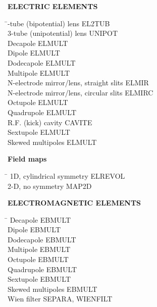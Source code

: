 \noindent\textbf{ELECTRIC ELEMENTS}  
\smallskip

\begin{tabbing}
\hspace*{7cm} \= -tube (bipotential) lens \> EL2TUB \\
  3-tube (unipotential) lens \> UNIPOT \\
  Decapole                \> ELMULT \\
  Dipole                  \> ELMULT \\
  Dodecapole              \> ELMULT \\
  Multipole               \> ELMULT \\
  N-electrode mirror/lens, straight slits            \> ELMIR \\
  N-electrode mirror/lens, circular slits            \> ELMIRC \\
  Octupole                \> ELMULT \\
  Quadrupole              \> ELMULT \\
  R.F. (kick) cavity             \> CAVITE \\
  Sextupole               \> ELMULT \\
  Skewed multipoles       \> ELMULT 
\end{tabbing}
\bigskip

\noindent\textbf{Field maps} 
\smallskip

\begin{tabbing}
\hspace*{7cm} \= \kill
 1D, cylindrical symmetry  \> ELREVOL  \\
  2-D, no symmetry          \> MAP2D 
\end{tabbing}

\newpage

\noindent\textbf{ELECTROMAGNETIC ELEMENTS}  
\smallskip

\begin{tabbing}
\hspace*{7cm} \= \kill
  Decapole                \> EBMULT \\
  Dipole                  \> EBMULT \\
  Dodecapole              \> EBMULT \\
  Multipole               \> EBMULT \\
  Octupole                \> EBMULT \\
  Quadrupole              \> EBMULT \\
  Sextupole               \> EBMULT \\
  Skewed multipoles       \> EBMULT \\
  Wien filter             \> SEPARA, WIENFILT 
\end{tabbing} 

